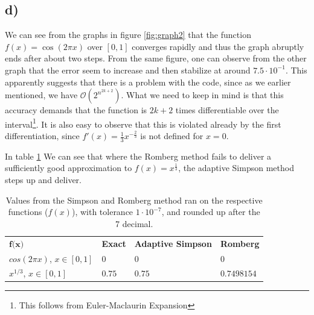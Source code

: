 \documentclass[12pt, a4paper,usenames,dvipsnames]{article}
\begin{document}
\subsection*{d)}
We can see from the graphs in figure \ref{fig:graph2} that the function \(f(x)=\cos(2\pi x)\) over \([0,1]\) converges rapidly and thus the graph abruptly ends after about two steps. From the same figure, one can observe from the other graph that the error seem to increase and then stabilize at around \(7.5\cdot 10^{-1}\). This apparently suggests that there is a problem with the code, since as we earlier mentioned, we have \(\mathcal{O}(2^{n^{2k+2}})\). What we need to keep in mind is that this accuracy demands that the function is \(2k+2\) times differentiable over the interval\footnote{This follows from Euler-Maclaurin Expansion}. It is also easy to observe that this is violated already by the first differentiation, since \(f'(x)=\frac{1}{3}x^{-\frac{2}{3}}\) is not defined for \(x=0\).

In table \ref{tab:simpsRomb} We can see that where the Romberg method fails to deliver a sufficiently good approximation to \(f(x)=x^{\frac{1}{3}}\), the adaptive Simpson method steps up and deliver.
\restoregeometry
\begin{table}[h]
\centering
\begin{tabular}{p{2cm}p{2.5cm}ll}

\rowcolor{XKCDpale}$\textbf{f(x)}$                     & \textbf{Exact}               & \textbf{Adaptive Simpson} & \textbf{Romberg} \\ \rowcolor{tableBack}
$cos(2 \pi x)$, \newline$x \in [0, 1]$      & 0                            & 0          & 0       \\ \rowcolor{tableBack}
$x^{1/3}$, \newline$x \in [0, 1]$ & $0.75$& $0.75$          & $0.7498154$       \\ 
\end{tabular}
\caption{Values from the Simpson and Romberg method ran on the respective functions ($f(x)$), with tolerance $1\cdot10^{-7}$, and rounded up after the 7 decimal.}
\label{tab:simpsRomb}
\end{table}
\end{document}
